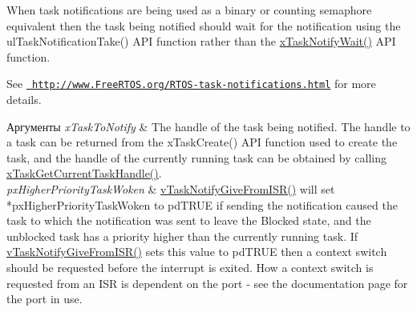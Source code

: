 \begin{DoxyPre}When task notifications are being used as a binary or counting semaphore
equivalent then the task being notified should wait for the notification
using the ulTaskNotificationTake() API function rather than the
\mbox{\hyperlink{task_8h_a0475fcda9718f403521c270a7270ff93}{xTaskNotifyWait()}} API function.\end{DoxyPre}



\begin{DoxyPre}See \href{http://www.FreeRTOS.org/RTOS-task-notifications.html}{\texttt{ http://www.FreeRTOS.org/RTOS-task-notifications.html}} for more details.\end{DoxyPre}



\begin{DoxyPre}
\begin{DoxyParams}{Аргументы}
{\em xTaskToNotify} & The handle of the task being notified.  The handle to a
task can be returned from the xTaskCreate() API function used to create the
task, and the handle of the currently running task can be obtained by calling
\mbox{\hyperlink{task_8h_a85a0f9c9f817b18686efbf8f37c72dfc}{xTaskGetCurrentTaskHandle()}}.\\
\hline
{\em pxHigherPriorityTaskWoken} & \mbox{\hyperlink{task_8h_a4a4bcf98ad282a596e13f3f30582a11b}{vTaskNotifyGiveFromISR()}} will set
*pxHigherPriorityTaskWoken to pdTRUE if sending the notification caused the
task to which the notification was sent to leave the Blocked state, and the
unblocked task has a priority higher than the currently running task.  If
\mbox{\hyperlink{task_8h_a4a4bcf98ad282a596e13f3f30582a11b}{vTaskNotifyGiveFromISR()}} sets this value to pdTRUE then a context switch
should be requested before the interrupt is exited.  How a context switch is
requested from an ISR is dependent on the port - see the documentation page
for the port in use.
\\
\hline
\end{DoxyParams}
\end{DoxyPre}
